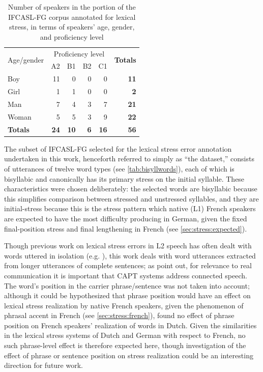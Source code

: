 	
		\begin{table}
			\centering
			\caption[Speakers in the annotated dataset]{Number of speakers in the portion of the IFCASL-FG corpus annotated for lexical stress, in terms of speakers' age, gender, and proficiency level}
			\begin{tabular}{lrrrrr}
			\toprule
			\multirow{2}{*}{Age/gender}	&	\multicolumn{4}{c}{Proficiency level} &\multirow{2}{*}{\textbf{Totals}}\\
			\cmidrule(lr){2-5}
		& A2	&	B1	&	B2	&	C1	&		\\
			\midrule
Boy	&	11	&	0	&	0	&	0	&	\textbf{11}	\\
Girl	&	1	&	1	&	0	&	0	&	\textbf{2}	\\
Man	&	7	&	4	&	3	&	7	&	\textbf{21}	\\
Woman	&	5	&	5	&	3	&	9	&	\textbf{22}	\\
\textbf{Totals}	&	\textbf{24}	&	\textbf{10}	&	\textbf{6}	&	\textbf{16}	&	\textbf{56}	\\
			\bottomrule
			\end{tabular}
			\label{tab:data:speakers}
		\end{table}
	
	
	The subset of IFCASL-FG selected for the lexical stress error annotation undertaken in this work, henceforth referred to simply as ``the dataset,''
	 consists of utterances of twelve word types (see \cref{tab:bisyllwords}), each of which is bisyllabic and canonically has its primary stress on the initial syllable. These characteristics were chosen deliberately: the selected words are bisyllabic because this simplifies comparison between stressed and unstressed syllables, and they are initial-stress because this is the stress pattern which native (L1) French speakers are expected to have the most difficulty producing in German, given the fixed final-position stress and final lengthening in French (see \cref{sec:stress:expected}). 
	
	Though previous work on lexical stress errors in L2 speech has often dealt with words uttered in isolation (e.g. \cite{Bonneau2011}), this work deals with word utterances extracted from longer utterances of complete sentences; as \textcite[p.~6]{Neri2002} point out, for relevance to real communication it is important that CAPT systems address connected speech. The word's position in the carrier phrase/sentence was not taken into account; although it could be hypothesized that phrase position would have an effect on lexical stress realization by native French speakers, given the phenomenon of phrasal accent in French (see \cref{sec:stress:french}), \textcite{Michaux2013} found no effect of phrase position on French speakers' realization of words in Dutch. Given the similarities in the lexical stress systems of Dutch and German with respect to French, no such phrase-level effect is therefore expected here, though investigation of the effect of phrase or sentence position on stress realization could be an interesting direction for future work.
	
